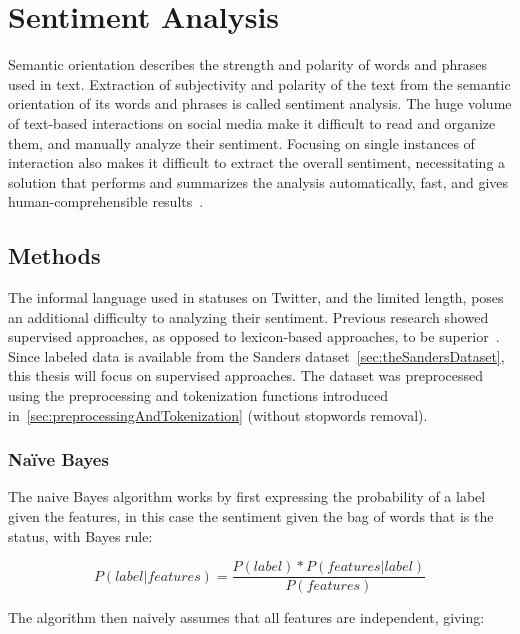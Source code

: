 \chapter{Sentiment Analysis}
\label{ch:sentimentAnalysis}

Semantic orientation describes the strength and polarity of words and phrases used in text.
Extraction of subjectivity and polarity of the text from the semantic orientation of its words and phrases is called sentiment analysis.
The huge volume of text-based interactions on social media make it difficult
to read and organize them, and manually analyze their sentiment.
Focusing on single instances of interaction also makes it difficult to extract the overall sentiment,
necessitating a solution that performs and summarizes the analysis automatically, fast, and gives human-comprehensible results~\cite{Sarlan2014}.

\section{Methods}
\label{sec:methods_sa}

The informal language used in statuses on Twitter, and the limited length, poses an additional difficulty
to analyzing their sentiment.
Previous research showed supervised approaches, as opposed to lexicon-based approaches, to be superior~\cite{Sarlan2014}.
Since labeled data is available from the Sanders dataset~\ref{sec:theSandersDataset},
this thesis will focus on supervised approaches.
The dataset was preprocessed using the preprocessing and tokenization functions introduced in~\ref{sec:preprocessingAndTokenization} (without stopwords removal).

\subsection{Na\"{i}ve Bayes}
\label{subsec:naivebayes}

The naive Bayes algorithm works by first expressing the probability of a label given the features,
in this case the sentiment given the bag of words that is the status, with Bayes rule:

\begin{equation}
    P(label|features) = \frac{P(label)*P(features|label)}{P(features)}
\end{equation}

The algorithm then naively assumes that all features are independent, giving:

